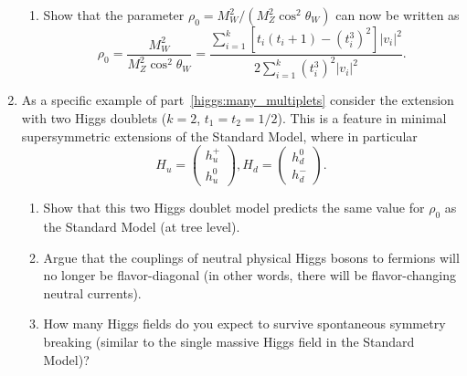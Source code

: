 \documentclass[letterpaper,11pt]{article}
\begin{document}
\begin{enumerate}
  \begin{enumerate}
    \item Show that the parameter $\rho_0 = M_W^2 / (M_Z^2 \cos^2\theta_W)$ can now be written as
    \begin{equation}
      \rho_0 =  \frac{M_W^2}{M_Z^2 \cos^2\theta_W} = \frac{\sum_{i=1}^k \left[t_i(t_i+1) - (t^3_i)^2\right] |v_i|^2}{2 \sum_{i=1}^k (t^3_i)^2 |v_i|^2}.
    \end{equation}
  \end{enumerate}
  \item As a specific example of part~\ref{higgs:many_multiplets} consider the extension with two Higgs doublets ($k = 2$, $t_1 = t_2 = 1/2$). This is a feature in minimal supersymmetric extensions of the Standard Model, where in particular
  \begin{equation}
    H_u = \left( \begin{array}{c} h_u^+ \\ h_u^0 \end{array} \right), H_d = \left( \begin{array}{c} h_d^0 \\ h_d^- \end{array} \right).
  \end{equation}
  \begin{enumerate}
    \item Show that this two Higgs doublet model predicts the same value for $\rho_0$ as the Standard Model (at tree level).
    \item Argue that the couplings of neutral physical Higgs bosons to fermions will no longer be flavor-diagonal (in other words, there will be flavor-changing neutral currents).
    \item How many Higgs fields do you expect to survive spontaneous symmetry breaking (similar to the single massive Higgs field in the Standard Model)?
  \end{enumerate}
\end{enumerate}
\end{document}
